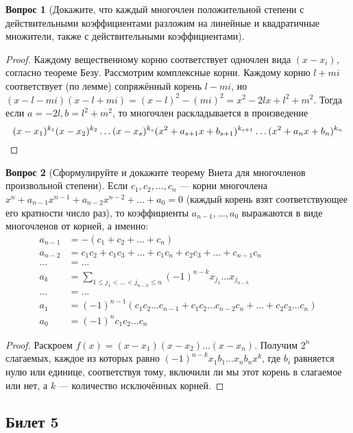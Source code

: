 \documentclass[a4paper,11pt]{article}
\theoremstyle{remark}
\theoremstyle{definition}
\newtheorem{question}{Вопрос}
\numberwithin{question}{subsection}
\begin{document}
\begin{question}[Докажите, что каждый многочлен положительной степени с действительными коэффициентами разложим на линейные и квадратичные множители, также с действительными коэффициентами]
\begin{proof}
Каждому вещественному корню соответствует одночлен вида \((x - x_i)\), согласно теореме Безу. Рассмотрим комплексные корни. Каждому корню \(l + mi\) соответствует (по лемме) сопряжённый корень \(l - mi\), но \((x - l - mi)(x - l + mi) = (x - l)^2 - (mi)^2 = x^2 - 2lx + l^2 + m^2\). Тогда если \(a = -2l, b = l^2 + m^2\), то многочлен раскладывается в произведение 
\begin{equation*}
	(x - x_1)^{k_1}(x - x_2)^{k_2}\dots(x - x_s)^{k_s}(x^2 + a_{s+1}x + b_{s+1})^{k_{s+1}}\dots(x^2 + a_nx + b_n)^{k_n} \qedhere
\end{equation*}
\end{proof}
\end{question}


\begin{question}[Сформулируйте и докажите теорему Виета для многочленов произвольной степени]
Если \(c_1,c_2,\dots,c_n\) --- корни многочлена \(x^n + a_{n-1}x^{n-1} + a_{n-2}x^{n-2} + \dots + a_0 = 0\) (каждый корень взят соответствующее его кратности число раз), то коэффициенты \(a_{n-1}, \dots, a_0\) выражаются в виде многочленов от корней, а именно:
\begin{align*}
    a_{n-1} &= -(c_1 + c_2 + \dots + c_n) \\
    a_{n-2} &= c_1c_2 + c_1c_3 + \dots + c_1c_n + c_2c_3 + \dots + c_{n-1}c_n \\
    \dots &= \dots \\
    a_{k} &= \sum_{1 \leqslant j_1 < \dots < j_{n-k} \leqslant n}(-1)^{n-k} x_{j_1} \dots x_{j_{n-k}} \\
    \dots &= \dots \\
    a_1 &= (-1)^{n-1}(c_1c_2\dots{}c_{n-1} + c_1c_2\dots{}c_{n-2}c_n + \dots + c_2c_3\dots{}c_n) \\
    a_0 &= (-1)^nc_1c_2\dots{}c_n
\end{align*}

\begin{proof}
Раскроем \(f(x) = (x-x_1)(x-x_2)\dots(x-x_n)\). Получим \(2^n\) слагаемых, каждое из которых равно \((-1)^{n-k}x_1b_1\dots{}x_nb_nx^k\), где \(b_i\) равняется нулю или единице, соответствуя тому, включили ли мы этот корень в слагаемое или нет, а \(k\) --- количество исключённых корней.
\end{proof}
\end{question}


\subsection{Билет 5}
\end{document}
